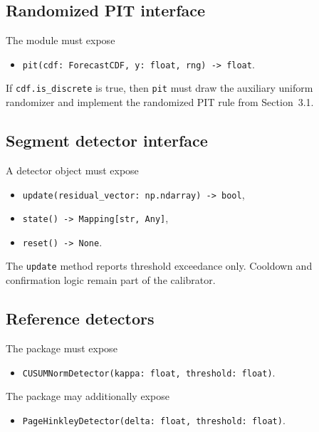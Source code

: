 \subsection{Randomized PIT interface}

\begin{description}[leftmargin=0pt,labelindent=0pt,style=nextline]
\item[\texttt{RandomizedPIT}]
The module must expose
\begin{itemize}[leftmargin=1.5em]
    \item \texttt{pit(cdf: ForecastCDF, y: float, rng) -> float}.
\end{itemize}
If \texttt{cdf.is\_discrete} is true, then \texttt{pit} must draw the auxiliary uniform randomizer and implement the randomized PIT rule from Section~3.1.
\end{description}

\subsection{Segment detector interface}

\begin{description}[leftmargin=0pt,labelindent=0pt,style=nextline]
\item[\texttt{SegmentDetector}]
A detector object must expose
\begin{itemize}[leftmargin=1.5em]
    \item \texttt{update(residual\_vector: np.ndarray) -> bool},
    \item \texttt{state() -> Mapping[str, Any]},
    \item \texttt{reset() -> None}.
\end{itemize}
The \texttt{update} method reports threshold exceedance only. Cooldown and confirmation logic remain part of the calibrator.
\end{description}

\subsection{Reference detectors}

\begin{description}[leftmargin=0pt,labelindent=0pt,style=nextline]
\item[\texttt{CUSUMNormDetector}]
The package must expose
\begin{itemize}[leftmargin=1.5em]
    \item \texttt{CUSUMNormDetector(kappa: float, threshold: float)}.
\end{itemize}

\item[\texttt{PageHinkleyDetector}]
The package may additionally expose
\begin{itemize}[leftmargin=1.5em]
    \item \texttt{PageHinkleyDetector(delta: float, threshold: float)}.
\end{itemize}
\end{description}

